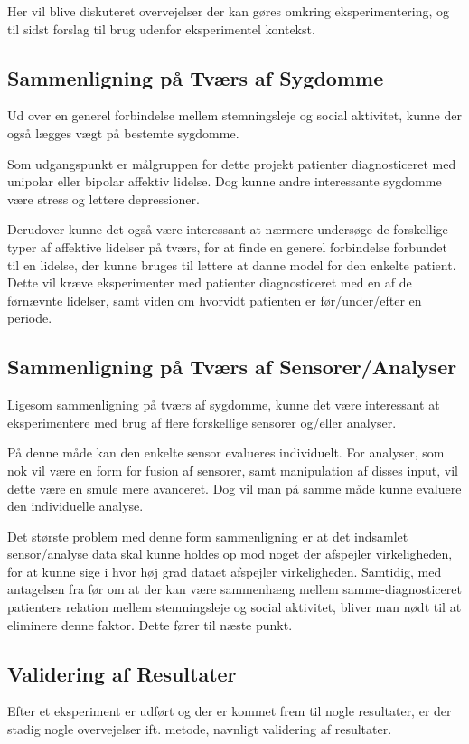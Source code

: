 Her vil blive diskuteret overvejelser der kan gøres omkring eksperimentering, og til sidst forslag til brug udenfor eksperimentel kontekst.

\subsection{Sammenligning på Tværs af Sygdomme}
Ud over en generel forbindelse mellem stemningsleje og social aktivitet, kunne der også lægges vægt på bestemte sygdomme.

Som udgangspunkt er målgruppen for dette projekt patienter diagnosticeret med unipolar eller bipolar affektiv lidelse.
Dog kunne andre interessante sygdomme være stress og lettere depressioner.

Derudover kunne det også være interessant at nærmere undersøge de forskellige typer af affektive lidelser på tværs, for at finde en generel forbindelse forbundet til en lidelse, der kunne bruges til lettere at danne model for den enkelte patient.
Dette vil kræve eksperimenter med patienter diagnosticeret med en af de førnævnte lidelser, samt viden om hvorvidt patienten er før/under/efter en periode.

\subsection{Sammenligning på Tværs af Sensorer/Analyser}
Ligesom sammenligning på tværs af sygdomme, kunne det være interessant at eksperimentere med brug af flere forskellige sensorer og/eller analyser.

På denne måde kan den enkelte sensor evalueres individuelt.
For analyser, som nok vil være en form for fusion af sensorer, samt manipulation af disses input, vil dette være en smule mere avanceret.
Dog vil man på samme måde kunne evaluere den individuelle analyse.

Det største problem med denne form sammenligning er at det indsamlet sensor/analyse data skal kunne holdes op mod noget der afspejler virkeligheden, for at kunne sige i hvor høj grad dataet afspejler virkeligheden.
Samtidig, med antagelsen fra før om at der kan være sammenhæng mellem samme-diagnosticeret patienters relation mellem stemningsleje og social aktivitet, bliver man nødt til at eliminere denne faktor.
Dette fører til næste punkt.

\subsection{Validering af Resultater}
Efter et eksperiment er udført og der er kommet frem til nogle resultater, er der stadig nogle overvejelser ift. metode, navnligt validering af resultater.

